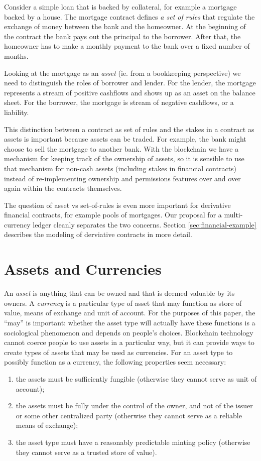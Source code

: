 \documentclass{llncs}
\begin{document}
Consider a simple loan that is backed by collateral, for example a mortgage backed by a house. The mortgage contract defines \emph{a set of rules} that regulate the exchange of money between the bank and the homeowner. At the beginning of the contract the bank pays out the principal to the borrower. After that, the homeowner has to make a monthly payment to the bank over a fixed number of months. 

Looking at the mortgage as an \emph{asset} (ie. from a bookkeeping perspective) we need to distinguish the roles of borrower and lender. For the lender, the mortgage represents a stream of positive cashflows and shows up as an asset on the balance sheet. For the borrower, the mortgage is stream of negative cashflows, or a liability. 

This distinction between a contract as set of rules and the stakes in a contract as assets is important because assets can be traded. For example, the bank might choose to sell the mortgage to another bank. With the blockchain we have a mechanism for keeping track of the ownership of assets, so it is sensible to use that mechanism for non-cash assets (including stakes in financial contracts) instead of re-implementing ownership and permissions features over and over again within the contracts themselves.

The question of asset vs set-of-rules is even more important for derivative financial contracts, for example pools of mortgages. Our proposal for a multi-currency ledger cleanly separates the two concerns. Section \ref{sec:financial-example} describes the modeling of derviative contracts in more detail.

\section{Assets and Currencies}
\label{sec:Preliminaries}

An \emph{asset} is anything that can be owned and that is deemed valuable by its owners. A \emph{currency} is a particular type of asset that may function as store of value, means of exchange and unit of account. For the purposes of this paper, the ``may'' is important: whether the asset type will actually have these functions is a sociological phenomenon and depends on people's choices. Blockchain technology cannot coerce people to use assets in a particular way, but it can provide ways to create types of assets that may be used as currencies. For an asset type to possibly function as a currency, the following properties seem necessary:
\begin{enumerate}
\item the assets must be sufficiently fungible (otherwise they cannot serve as unit of account);
\item the assets must be fully under the control of the owner, and not of the issuer or some other centralized party (otherwise they cannot serve as a reliable means of exchange);
\item the asset type must have a reasonably predictable minting policy (otherwise they cannot serve as a trusted store of value).
\end{enumerate}
\end{document}
